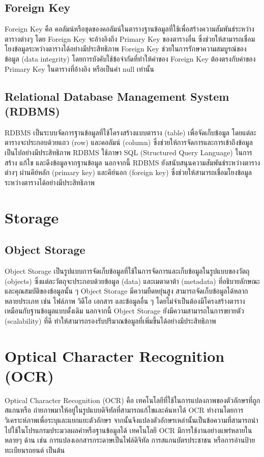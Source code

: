   \subsection{Foreign Key}
    \qquad Foreign Key คือ คอลัมน์หรือชุดของคอลัมน์ในตารางฐานข้อมูลที่ใช้เพื่อสร้างความสัมพันธ์ระหว่างตารางต่างๆ โดย Foreign Key จะอ้างอิงถึง Primary Key ของตารางอื่น ซึ่งช่วยให้สามารถเชื่อมโยงข้อมูลระหว่างตารางได้อย่างมีประสิทธิภาพ Foreign Key ช่วยในการรักษาความสมบูรณ์ของข้อมูล (data integrity) โดยการบังคับใช้ข้อจำกัดที่ทำให้ค่าของ Foreign Key ต้องตรงกับค่าของ Primary Key ในตารางที่อ้างอิง หรือเป็นค่า null เท่านั้น
  \subsection{Relational Database Management System (RDBMS)}
    \qquad RDBMS เป็นระบบจัดการฐานข้อมูลที่ใช้โครงสร้างแบบตาราง (table) เพื่อจัดเก็บข้อมูล โดยแต่ละตารางจะประกอบด้วยแถว (row) และคอลัมน์ (column) ซึ่งช่วยให้การจัดการและการเข้าถึงข้อมูลเป็นไปอย่างมีประสิทธิภาพ RDBMS ใช้ภาษา SQL (Structured Query Language) ในการสร้าง แก้ไข และดึงข้อมูลจากฐานข้อมูล นอกจากนี้ RDBMS ยังสนับสนุนความสัมพันธ์ระหว่างตารางต่างๆ ผ่านคีย์หลัก (primary key) และคีย์นอก (foreign key) ซึ่งช่วยให้สามารถเชื่อมโยงข้อมูลระหว่างตารางได้อย่างมีประสิทธิภาพ

\section{Storage}
  \subsection{Object Storage}
    \qquad Object Storage เป็นรูปแบบการจัดเก็บข้อมูลที่ใช้ในการจัดการและเก็บข้อมูลในรูปแบบของวัตถุ (objects) ซึ่งแต่ละวัตถุจะประกอบด้วยข้อมูล (data) และเมตาดาต้า (metadata) ที่อธิบายลักษณะและคุณสมบัติของข้อมูลนั้น ๆ Object Storage มีความยืดหยุ่นสูง สามารถจัดเก็บข้อมูลได้หลากหลายประเภท เช่น ไฟล์ภาพ วิดีโอ เอกสาร และข้อมูลอื่น ๆ โดยไม่จำเป็นต้องมีโครงสร้างตารางเหมือนกับฐานข้อมูลแบบดั้งเดิม นอกจากนี้ Object Storage ยังมีความสามารถในการขยายตัว (scalability) ที่ดี ทำให้สามารถรองรับปริมาณข้อมูลที่เพิ่มขึ้นได้อย่างมีประสิทธิภาพ

\section{Optical Character Recognition (OCR)}
  \qquad Optical Character Recognition (OCR) คือ เทคโนโลยีที่ใช้ในการแปลงภาพของตัวอักษรที่ถูกสแกนหรือ
  ถ่ายภาพมาให้อยู่ในรูปแบบดิจิทัลที่สามารถแก้ไขและค้นหาได้ OCR ทำงานโดยการวิเคราะห์ภาพเพื่อระบุและแยกแยะตัวอักษร
  จากนั้นจึงแปลงตัวอักษรเหล่านั้นเป็นข้อความที่สามารถนำไปใช้ในโปรแกรมประมวลผลคำหรือฐานข้อมูลได้ 
  เทคโนโลยี OCR มีการใช้งานอย่างแพร่หลายในหลายๆ ด้าน เช่น การแปลงเอกสารกระดาษเป็นไฟล์ดิจิทัล 
  การสแกนบัตรประชาชน หรือการอ่านป้ายทะเบียนรถยนต์ เป็นต้น
